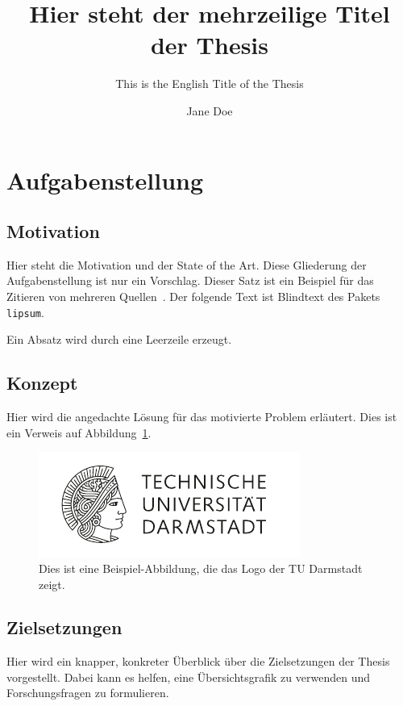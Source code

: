 \documentclass[
	ngerman,
	ruledheaders=section,%
	class=report,%
	thesis={type=master},%
	accentcolor=1b,%
	custommargins=false,%
	marginpar=false,%
	BCOR=12mm,%
	parskip=half-,%
	fontsize=11pt,%
	IMRAD=false,%
]{tudapub}
\begin{document}
\frontmatter


\title{Hier steht der mehrzeilige Titel der Thesis}
\subtitle{This is the English Title of the Thesis} %
\author[J. Doe]{Jane Doe}


\submissiondate{\today}
\examdate{\today}

\maketitle

\mainmatter

\chapter*{Aufgabenstellung}

\section*{Motivation}

Hier steht die Motivation und der State of the Art.
Diese Gliederung der Aufgabenstellung ist nur ein Vorschlag.
Dieser Satz ist ein Beispiel für das Zitieren von mehreren Quellen~\cite{Luthmann2017,Luthmann2019,Ruland2018}.
Der folgende Text ist Blindtext des Pakets \texttt{lipsum}.
\lipsum[1]

Ein Absatz wird durch eine Leerzeile erzeugt.
\lipsum[2]



\section*{Konzept}

Hier wird die angedachte Lösung für das motivierte Problem erläutert.
Dies ist ein Verweis auf Abbildung~\ref{fig:some-figure}.
\lipsum[3]

\begin{figure}[tp]
    \centering
    \includegraphics[width=.3\linewidth]{figures/sample-figure.pdf}
    \caption{Dies ist eine Beispiel-Abbildung, die das Logo der TU Darmstadt zeigt.}\label{fig:some-figure}
\end{figure}



\section*{Zielsetzungen}

Hier wird ein knapper, konkreter Überblick über die Zielsetzungen der Thesis vorgestellt.
Dabei kann es helfen, eine Übersichtsgrafik zu verwenden und Forschungsfragen zu formulieren.
\lipsum[4]





	
\end{document}
